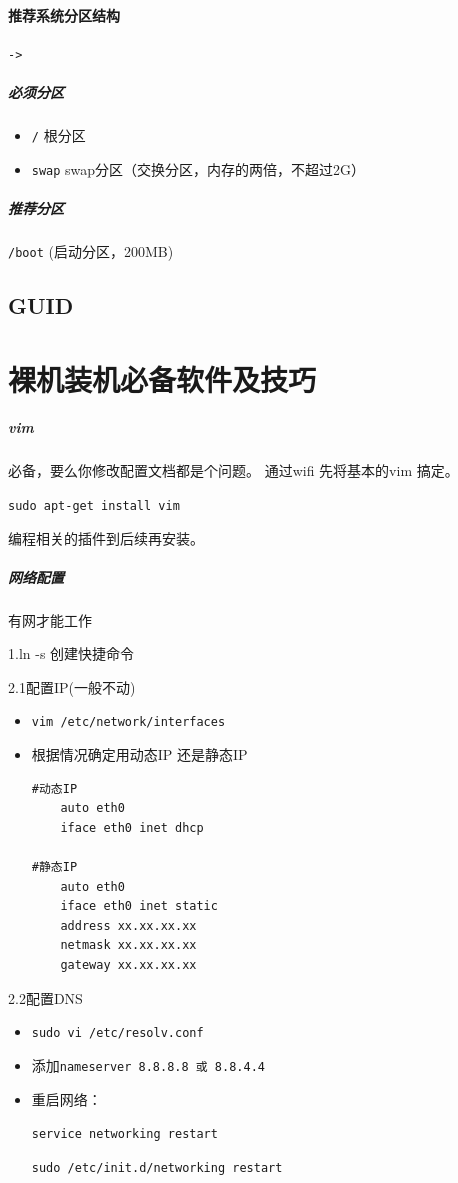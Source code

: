 \documentclass[UTF8,a4paper,12pt]{ctexbook}
\begin{document}
				\paragraph{推荐系统分区结构}\verb|->|
				\subparagraph{必须分区}
					\begin{itemize}[itemindent = 1em]
						\item \verb|/| 根分区
						\item \verb|swap| swap分区（交换分区，内存的两倍，不超过2G）
					\end{itemize}
					
				\subparagraph{推荐分区}\verb|/boot| (启动分区，200MB)
				
				
				
			\subsection{GUID}
	\section{裸机装机必备软件及技巧}
		\subparagraph{vim}必备，要么你修改配置文档都是个问题。
			通过wifi 先将基本的vim 搞定。
			
			\verb|sudo apt-get install vim|
			
			编程相关的插件到后续再安装。
			
		\subparagraph{网络配置}有网才能工作
			
			1.ln -s 创建快捷命令
			
			2.1配置IP(一般不动)
			\begin{itemize}[itemindent = 1em]
				\item \verb|vim /etc/network/interfaces|
				\item 根据情况确定用动态IP 还是静态IP 
				\begin{lstlisting}
#动态IP 
	auto eth0
	iface eth0 inet dhcp
	
#静态IP
	auto eth0
	iface eth0 inet static
	address xx.xx.xx.xx
	netmask xx.xx.xx.xx
	gateway xx.xx.xx.xx
				\end{lstlisting}
			\end{itemize}
			
			2.2配置DNS
			\begin{itemize}[itemindent = 1em]
				\item \verb|sudo vi /etc/resolv.conf|
				\item 添加\verb|nameserver 8.8.8.8 或 8.8.4.4|
				\item 重启网络：
				
				\verb|service networking restart|
				
				\verb|sudo /etc/init.d/networking restart|
			\end{itemize}
			
\end{document}
